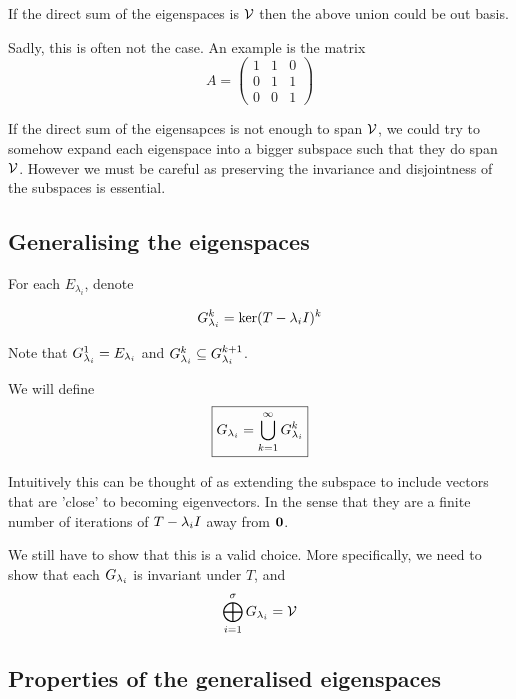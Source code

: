 If the direct sum of the eigenspaces is \(\mathcal{V}\) then the above union could be out basis.

Sadly, this is often not the case.
An example is the matrix
\begin{equation*}
    A = \begin{pmatrix}
        1 & 1 & 0 \\
        0 & 1 & 1 \\
        0 & 0 & 1
    \end{pmatrix}
\end{equation*}

If the direct sum of the eigensapces is not enough to span \(\mathcal{V}\), we could try to somehow expand each eigenspace into a bigger subspace such that they do span \(\mathcal{V}\). 
However we must be careful as preserving the invariance and disjointness of the subspaces is essential.

\subsection{Generalising the eigenspaces}

For each \(E_{\lambda_i}\), denote

\begin{equation*}
    G_{\lambda_i}^{k}=\ker(T-\lambda_iI)^k
\end{equation*}

Note that \(G_{\lambda_i}^1=E_{\lambda_i}\) and \(G_{\lambda_i}^{k}\subseteq G_{\lambda_i}^{k+1}\).

We will define
\begin{equation*}
    \boxed{
        G_{\lambda_i}=\bigcup_{k=1}^{\infty} G_{\lambda_i}^k
    }
\end{equation*}

Intuitively this can be thought of as extending the subspace to include vectors that are 'close' to becoming eigenvectors.
In the sense that they are a finite number of iterations of \(T- \lambda_iI\) away from \(\mathbf{0}\).

We still have to show that this is a valid choice.
More specifically, we need to show that each \(G_{\lambda_i}\) is invariant under \(T\), and
\begin{equation*}
    \bigoplus_{i=1}^\sigma G_{\lambda_i}=\mathcal{V}
\end{equation*}


\subsection{Properties of the generalised eigenspaces}

